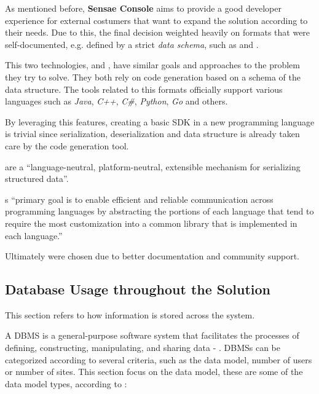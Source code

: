 As mentioned before, \textbf{Sensae Console} aims to provide a good developer experience for external costumers that want to expand the solution according to their needs. Due to this, the final decision weighted heavily on formats that were self-documented, e.g. defined by a strict \textit{data schema}, such as  and .

This two technologies,  and , have similar goals and approaches to the problem they try to solve. They both rely on code generation based on a schema of the data structure. The tools related to this formats officially support various languages such as \textit{Java}, \textit{C++}, \textit{C\#}, \textit{Python}, \textit{Go} and others. 

By leveraging this features, creating a basic \gls{SDK} in a new programming language is trivial since serialization, deserialization and data structure is already taken care by the code generation tool.

 are a ``language-neutral, platform-neutral, extensible mechanism for serializing structured data''.

s ``primary goal is to enable efficient and reliable communication across programming languages by abstracting the portions of each language that tend to require the most customization into a common library that is implemented in each language.''

Ultimately  were chosen due to better documentation and community support.


\subsection{Database Usage throughout the Solution}
\label{subsec:implementation:decisions:database}

This section refers to how information is stored across the system.

A \gls{DBMS} is a general-purpose software system that facilitates the processes of defining, constructing, manipulating, and sharing data - . \gls{DBMS}s can be categorized according to several criteria, such as the data model, number of users or number of sites. This section focus on the data model, these are some of the data model types, according to \cite{elmasri2000fundamentals}: 

